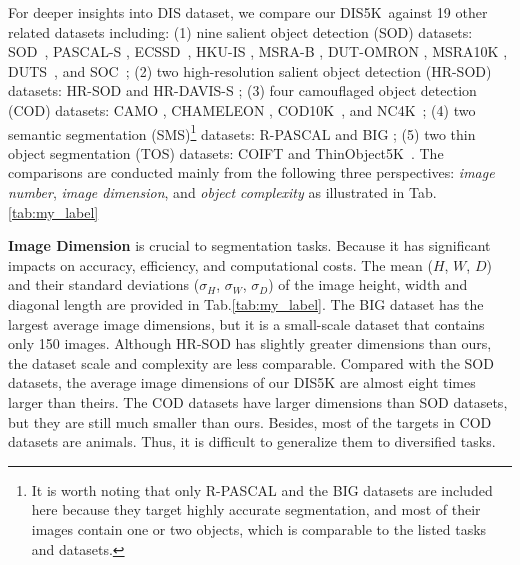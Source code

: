 For deeper insights into DIS dataset, we compare our DIS5K~against 19 other related datasets including: (1) nine salient object detection (SOD) datasets: SOD~\cite{movahedi2010design}, PASCAL-S \cite{li2014secrets}, ECSSD~\cite{yan2013hierarchical}, HKU-IS \cite{li2015visual}, MSRA-B \cite{DBLP:journals/pami/LiuYSWZTS11}, DUT-OMRON \cite{yang2013saliency}, MSRA10K \cite{DBLP:journals/pami/ChengMHTH15}, DUTS~\cite{wang2017learning}, and SOC~\cite{fan2018SOC}; (2) two high-resolution salient object detection (HR-SOD) datasets: HR-SOD \cite{zeng2019towards} and HR-DAVIS-S \cite{perazzi2016benchmark,zeng2019towards}; (3) four camouflaged object detection (COD) datasets: CAMO \cite{le2019anabranch}, CHAMELEON \cite{chameleon}, COD10K~\cite{fan2020camouflaged}, and NC4K~\cite{lv2021simultaneously}; (4) two semantic segmentation (SMS)\footnote{
It is worth noting that only R-PASCAL and the BIG datasets are included here because they target highly accurate segmentation, and most of their images contain one or two objects, which is comparable to the listed tasks and datasets.} datasets: R-PASCAL \cite{everingham2010pascal,cheng2020cascadepsp} and BIG \cite{cheng2020cascadepsp}; (5) two thin object segmentation (TOS) datasets: COIFT \cite{liew2021deep} and ThinObject5K~\cite{liew2021deep}. The comparisons are conducted mainly from the following three perspectives: \textit{image number}, \textit{image dimension}, and \textit{object complexity} as illustrated in Tab.\ref{tab:my_label}

\textbf{Image Dimension} is crucial to segmentation tasks. Because it has significant impacts on accuracy, efficiency, and computational costs. The mean ($H$, $W$, $D$) and their standard deviations ($\sigma_H$, $\sigma_W$, $\sigma_D$) of the image height, width and diagonal length are provided in Tab.\ref{tab:my_label}. The BIG dataset has the largest average image dimensions, but it is a small-scale dataset that contains only 150 images. Although HR-SOD has slightly greater dimensions than ours, the dataset scale and complexity are less comparable. Compared with the SOD datasets, the average image dimensions of our DIS5K are almost eight times larger than theirs. The COD datasets have larger dimensions than SOD datasets, but they are still much smaller than ours. Besides, most of the targets in COD datasets are animals. Thus, it is difficult to generalize them to diversified tasks.

